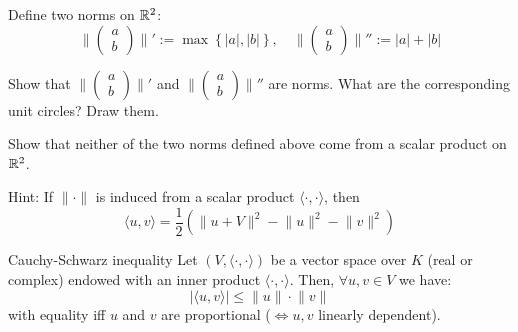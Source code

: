 \documentclass[12pt]{article}
\begin{document}
\begin{exercise}{}{}
    Define two norms on $\mathbb{R}^2$:
    $$
        \lVert \begin{pmatrix} a \\ b \end{pmatrix} \rVert' := \max\left\{|a|, |b|\right\}, \quad \lVert \begin{pmatrix} a \\ b \end{pmatrix} \rVert'' := |a| + |b|
    $$

    Show that $\lVert \begin{pmatrix} a \\ b \end{pmatrix} \rVert'$ and $\lVert \begin{pmatrix} a \\ b \end{pmatrix} \rVert''$ are norms. What are the corresponding unit circles? Draw them.
\end{exercise}

\begin{exercise}{}{}
    Show that neither of the two norms defined above come from a scalar product on $\mathbb{R}^2$.

    Hint: If $\lVert \cdot \rVert$ is induced from a scalar product $\langle \cdot, \cdot \rangle$, then
    $$
        \langle u, v \rangle = \frac{1}{2}\left(\lVert u + V \rVert^2 - \lVert u \rVert^2 - \lVert v \rVert^2\right)
    $$
\end{exercise}

\begin{theorem}{Cauchy-Schwarz inequality}{}
    Let $(V, \langle \cdot, \cdot \rangle)$ be a vector space over $K$ (real or complex) endowed with an inner product $\langle \cdot, \cdot \rangle$. Then, $\forall u, v \in V$ we have:
    $$
        |\langle u, v \rangle| \leq \lVert u \rVert \cdot \lVert v \rVert
    $$
    with equality iff $u$ and $v$ are proportional ($\iff u, v$ linearly dependent).
\end{theorem}
\end{document}
